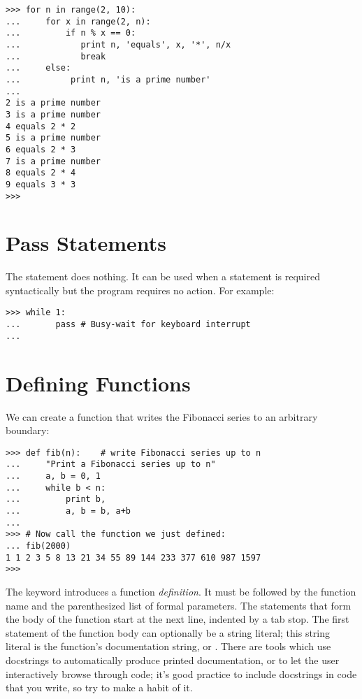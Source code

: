\bcode\begin{verbatim}
>>> for n in range(2, 10):
...     for x in range(2, n):
...         if n % x == 0:
...            print n, 'equals', x, '*', n/x
...            break
...     else:
...          print n, 'is a prime number'
... 
2 is a prime number
3 is a prime number
4 equals 2 * 2
5 is a prime number
6 equals 2 * 3
7 is a prime number
8 equals 2 * 4
9 equals 3 * 3
>>> 
\end{verbatim}\ecode

\section{Pass Statements}

The  statement does nothing.
It can be used when a statement is required syntactically but the
program requires no action.
For example:

\bcode\begin{verbatim}
>>> while 1:
...       pass # Busy-wait for keyboard interrupt
... 
\end{verbatim}\ecode

\section{Defining Functions}

We can create a function that writes the Fibonacci series to an
arbitrary boundary:

\bcode\begin{verbatim}
>>> def fib(n):    # write Fibonacci series up to n
...     "Print a Fibonacci series up to n"
...     a, b = 0, 1
...     while b < n:
...         print b,
...         a, b = b, a+b
... 
>>> # Now call the function we just defined:
... fib(2000)
1 1 2 3 5 8 13 21 34 55 89 144 233 377 610 987 1597
>>> 
\end{verbatim}\ecode
%
The keyword  introduces a function \emph{definition}.  It must
be followed by the function name and the parenthesized list of formal
parameters.  The statements that form the body of the function start
at the next line, indented by a tab stop.  The first statement of the
function body can optionally be a string literal; this string literal
is the function's documentation string, or .  There are
tools which use docstrings to automatically produce printed
documentation, or to let the user interactively browse through code;
it's good practice to include docstrings in code that you write, so
try to make a habit of it.

